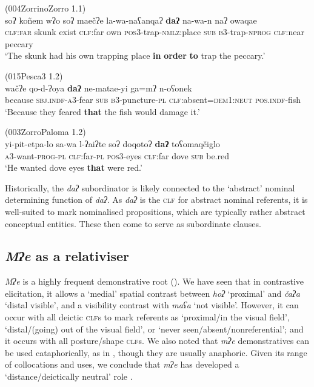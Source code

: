 \documentclass[output=paper,colorlinks,citecolor=brown]{langscibook}
\begin{document}
\ea\label{ex:payne:84} (004ZorrinoZorro 1.1)\\
\gll  soʔ  koñem  wʔo  soʔ  maečʔe  la-wa-naʕanqaʔ \textbf{daʔ}  na-wa-n  naʔ  owaqae\\
\textsc{clf:far} skunk  exist \textsc{clf}:far own  \textsc{pos3}-trap-\textsc{nmlz}:place \textsc{sub}  \textsc{b3}-trap-\textsc{nprog}  \textsc{clf}:near  peccary\\
\glt ‘The skunk had his own trapping place \textbf{in} \textbf{order} \textbf{to} trap the peccary.’ 
\z

\ea\label{ex:payne:85} (015Pesca3 1.2)\\
\gll  wačʔe  qo-d-ʔoya  \textbf{daʔ}  ne-matae-yi  ga=mʔ  n-oʕonek\\
because  \textsc{sbj.indf-a3}-fear  \textsc{sub}  \textsc{b3}-puncture-\textsc{pl}  \textsc{clf}:absent=\textsc{dem1:neut} \textsc{pos.indf}-fish\\
\glt ‘Because they feared \textbf{that} the fish would damage it.’ 
\z

\ea\label{ex:payne:86} (003ZorroPaloma 1.2)\\
\gll  yi-pit-etpa-lo  sa-wa  l-ʔaiʔte  soʔ  doqotoʔ \textbf{daʔ}  toʕomaqčiglo\\
\textsc{a3}-want-\textsc{prog-pl}  \textsc{clf}:far-\textsc{pl}  \textsc{pos3}-eyes  \textsc{clf}:far dove \textsc{sub} be.red\\
\glt ‘He wanted dove eyes \textbf{that} were red.’ 
\z

Historically, the \textit{daʔ} subordinator is likely connected to the ‘abstract’ nominal determining function of \textit{daʔ}. As \textit{daʔ} is the \textsc{clf} for abstract nominal referents, it is well-suited to mark nominalised propositions, which are typically rather abstract conceptual entities. These then come to serve as subordinate clauses.

 \subsection{\textit{Mʔe} as a relativiser}\label{sec:payne:7.4}

\textit{Mʔe} is a highly frequent demonstrative root (). We have seen that in contrastive elicitation, it allows a ‘medial’ spatial contrast between \textit{hoʔ} ‘proximal’ and \textit{čaʔa} ‘distal visible’, and a visibility contrast with \textit{maʕa} ‘not visible’. However, it can occur with all deictic \textsc{clf}s to mark referents as ‘proximal/in the visual field’, ‘distal/(going) out of the visual field’, or ‘never seen/absent/nonreferential’; and it occurs with all posture/shape \textsc{clf}s. We also noted that \textit{mʔe} demonstratives can be used cataphorically, as in , though they are usually anaphoric. Given its range of collocations and uses, we conclude that \textit{mʔe} has developed a ‘distance/deictically neutral’ role \citep[211]{Himmelmann1996}.
\end{document}
